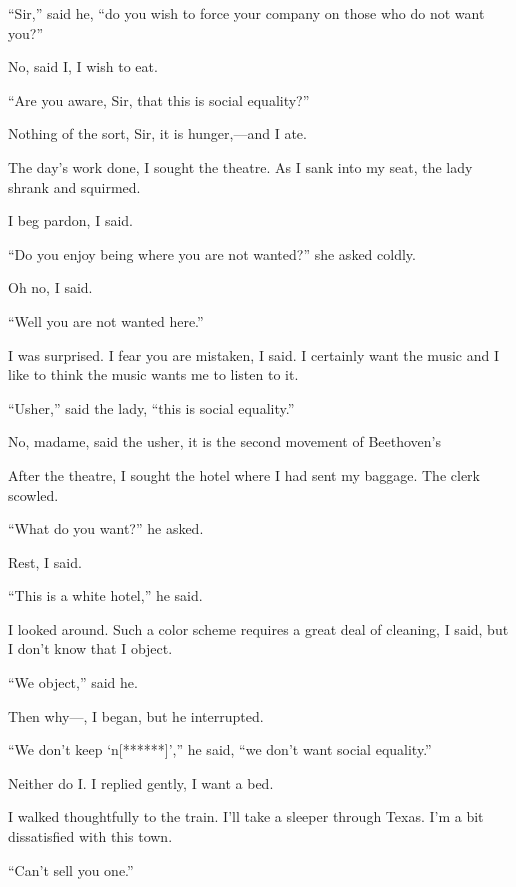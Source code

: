 \documentclass[letterpaper,10pt,english]{jupyterBook}
\begin{document}
\sphinxAtStartPar
“Sir,” said he, “do you wish to force your company on those who do not want you?”

\sphinxAtStartPar
No, said I, I wish to eat.

\sphinxAtStartPar
“Are you aware, Sir, that this is social equality?”

\sphinxAtStartPar
Nothing of the sort, Sir, it is hunger,—and I ate.

\sphinxAtStartPar
The day’s work done, I sought the theatre. As I sank into my seat, the lady shrank and squirmed.

\sphinxAtStartPar
I beg pardon, I said.

\sphinxAtStartPar
“Do you enjoy being where you are not wanted?” she asked coldly.

\sphinxAtStartPar
Oh no, I said.

\sphinxAtStartPar
“Well you are not wanted here.”

\sphinxAtStartPar
I was surprised. I fear you are mistaken, I said. I certainly want the music and I like to think the music wants me to listen to it.

\sphinxAtStartPar
“Usher,” said the lady, “this is social equality.”

\sphinxAtStartPar
No, madame, said the usher, it is the second movement of Beethoven’s

\sphinxAtStartPar
After the theatre, I sought the hotel where I had sent my baggage. The clerk scowled.

\sphinxAtStartPar
“What do you want?” he asked.

\sphinxAtStartPar
Rest, I said.

\sphinxAtStartPar
“This is a white hotel,” he said.

\sphinxAtStartPar
I looked around. Such a color scheme requires a great deal of cleaning, I said, but I don’t know that I object.

\sphinxAtStartPar
“We object,” said he.

\sphinxAtStartPar
Then why—, I began, but he interrupted.

\sphinxAtStartPar
“We don’t keep ‘n{[}******{]}’,” he said, “we don’t want social equality.”

\sphinxAtStartPar
Neither do I. I replied gently, I want a bed.

\sphinxAtStartPar
I walked thoughtfully to the train. I’ll take a sleeper through Texas. I’m a bit dissatisfied with this town.

\sphinxAtStartPar
“Can’t sell you one.”
\end{document}
